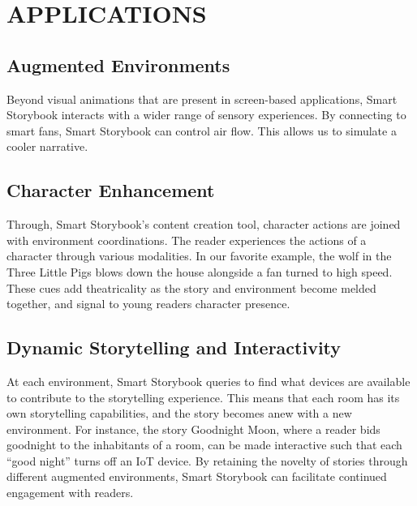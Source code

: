 \documentclass{sigchi}
\begin{document}

\section{APPLICATIONS}
\subsection{Augmented Environments}
Beyond visual animations that are present in screen-based applications, Smart Storybook interacts with a wider range of sensory experiences. By connecting to smart fans, Smart Storybook can control air flow. This allows us to simulate a cooler narrative.
\subsection{Character Enhancement}
Through, Smart Storybook's content creation tool, character actions are joined with environment coordinations. The reader experiences the actions of a character through various modalities. In our favorite example, the wolf in the Three Little Pigs blows down the house alongside a fan turned to high speed. These cues add theatricality as the story and environment become melded together, and signal to young readers character presence. 
\subsection{Dynamic Storytelling and Interactivity}
At each environment, Smart Storybook queries to find what devices are available to contribute to the storytelling experience. This means that each room has its own storytelling capabilities, and the story becomes anew with a new environment. For instance, the story Goodnight Moon, where a reader bids goodnight to the inhabitants of a room, can be made interactive such that each “good night” turns off an IoT device. By retaining the novelty of stories through different augmented environments, Smart Storybook can facilitate continued engagement with readers. 

\end{document}
